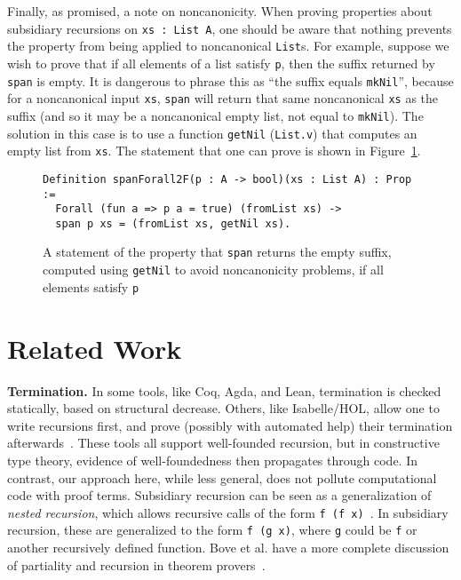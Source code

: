 \documentclass[a4paper,USenglish]{lipics-v2021}
\begin{document}
Finally, as promised, a note on noncanonicity. When proving properties about subsidiary
recursions on \verb|xs : List A|, one should be aware that nothing prevents
the property from being applied to noncanonical \verb|List|s.  For example,
suppose we wish to prove that if all elements of a  list satisfy \verb|p|, then
the suffix returned by \verb|span| is empty.  It is dangerous to phrase
this as ``the suffix equals \verb|mkNil|'', because for a noncanonical input \verb|xs|,
\verb|span| will return that same  noncanonical \verb|xs| as the suffix (and so
it may be a noncanonical empty list, not equal to \verb|mkNil|).  The solution
in this case is to use a function \verb|getNil| (\verb|List.v|) that computes
an empty list from \verb|xs|.  The statement that one can prove is shown in Figure~\ref{fig:spanforallt}.

\begin{figure}
\begin{verbatim}
Definition spanForall2F(p : A -> bool)(xs : List A) : Prop :=
  Forall (fun a => p a = true) (fromList xs) ->
  span p xs = (fromList xs, getNil xs).
\end{verbatim}
\caption{A statement of the property that \texttt{span} returns the empty suffix, computed using \texttt{getNil} to avoid noncanonicity problems, if all elements satisfy \texttt{p}}
\label{fig:spanforallt}
\end{figure}

\section{Related Work}
\label{sec:related}

\textbf{Termination.}  In some tools, like Coq, Agda, and Lean,
termination is checked statically, based on structural decrease.
Others, like Isabelle/HOL, allow one to write recursions first, and
prove (possibly with automated help) their termination
afterwards~\cite{krauss}.  These tools all support well-founded
recursion, but in constructive type theory, evidence of
well-foundedness then propagates through code.  In contrast, our
approach here, while less general, does not pollute computational code
with proof terms.
Subsidiary recursion can be seen as a generalization of \emph{nested
recursion}, which allows recursive calls of the form
\verb|f (f x)|~\cite{krauss10}.  In subsidiary recursion, these are
generalized to the form \verb|f (g x)|, where \verb|g| could be
\verb|f| or another recursively defined function.  Bove et al. have a
more complete discussion of partiality and recursion in theorem provers~\cite{bove+16}.
\end{document}
